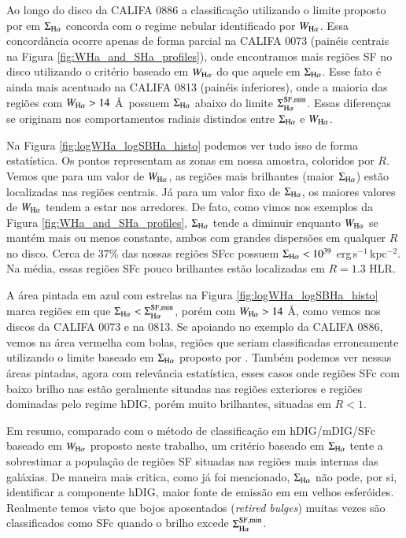 Ao longo do disco da CALIFA 0886 a classificação utilizando o limite proposto por \citet{Zhang.etal.2017a} em $\Sigma_{\Ha}$ concorda com o regime nebular identificado por $W_{\Ha}$. Essa concordância ocorre apenas de forma parcial na CALIFA 0073 (painéis centrais na Figura \ref{fig:WHa_and_SHa_profiles}), onde encontramos mais regiões SF no disco utilizando o critério baseado em $W_{\Ha}$ do que aquele em $\Sigma_{\Ha}$. Esse fato é ainda mais acentuado na CALIFA 0813 (painéis inferiores), onde a maioria das regiões com $W_{\Ha} > 14$ \AA\ possuem $\Sigma_{\Ha}$ abaixo do limite $\Sigma^{\rm SF,min}_{\Ha}$. Essas diferenças se originam nos comportamentos radiais distindos entre $\Sigma_{\Ha}$ e $W_{\Ha}$.

Na Figura \ref{fig:logWHa_logSBHa_histo} podemos ver tudo isso de forma estatística. Os pontos representam as zonas em nossa amostra, coloridos por $R$. Vemos que para um valor de $W_{\Ha}$, as regiões mais brilhantes (maior $\Sigma_{\Ha}$) estão localizadas nas regiões centrais. Já para um valor fixo de $\Sigma_{\Ha}$, os maiores valores de $W_{\Ha}$ tendem a estar nos arredores. De fato, como vimos nos exemplos da Figura \ref{fig:WHa_and_SHa_profiles}, $\Sigma_{\Ha}$ tende a diminuir enquanto $W_{\Ha}$ se mantém mais ou menos constante, ambos com grandes dispersões em qualquer $R$ no disco. Cerca de 37\% das nossas regiões SFcc possuem $\Sigma_{\Ha} < 10^{39}$ erg$\,$s$^{-1}\,$kpc$^{-2}$. Na média, essas regiões SFc pouco brilhantes estão localizadas em $R = 1.3$ HLR.

A área pintada em azul com estrelas na Figura \ref{fig:logWHa_logSBHa_histo} marca regiões em que $\Sigma_{\Ha} < \Sigma^{\rm SF,min}_{\Ha}$, porém com $W_{\Ha} > 14$ \AA, como vemos nos discos da CALIFA 0073 e na 0813. Se apoiando no exemplo da CALIFA 0886, vemos na área vermelha com bolas, regiões que seriam classificadas erroneamente utilizando o limite baseado em $\Sigma_{\Ha}$ proposto por \citet{Zhang.etal.2017a}. Também podemos ver nessas áreas pintadas, agora com relevância estatística, esses casos onde regiões SFc com baixo brilho nas estão geralmente situadas nas regiões exteriores e regiões dominadas pelo regime hDIG, porém muito brilhantes, situadas em $R < 1$.

Em resumo, comparado com o método de classificação em hDIG/mDIG/SFc baseado em $W_{\Ha}$ proposto neste trabalho, um critério baseado em $\Sigma_{\Ha}$ tente a sobrestimar a população de regiões SF situadas nas regiões mais internas das galáxias. De maneira mais critica, como já foi mencionado, $\Sigma_{\Ha}$ não pode, por si, identificar a componente hDIG, maior fonte de emissão em \Ha em velhos esferóides. Realmente temos visto que bojos aposentados ({\em retired bulges}) muitas vezes são classificados como SFc quando o brilho excede $\Sigma^{\rm SF,min}_{\Ha}$.

